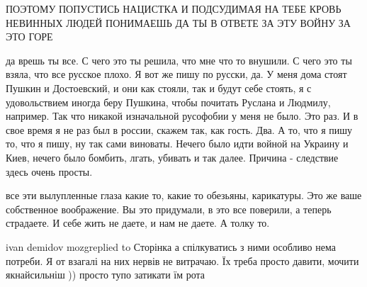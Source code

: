 ПОЭТОМУ ПОПУСТИСЬ НАЦИСТКА И ПОДСУДИМАЯ НА ТЕБЕ КРОВЬ НЕВИННЫХ ЛЮДЕЙ ПОНИМАЕШЬ
ДА ТЫ В ОТВЕТЕ ЗА ЭТУ ВОЙНУ ЗА ЭТО ГОРЕ

да врешь ты все. С чего это ты решила, что мне что то внушили. С чего это ты
взяла, что все русское плохо. Я вот же пишу по русски, да. У меня дома стоят
Пушкин и Достоевский, и они как стояли, так и будут себе стоять, я с
удовольствием иногда беру Пушкина, чтобы почитать Руслана и Людмилу, например.
Так что никакой изначальной русофобии у меня не было. Это раз. И в свое время я
не раз был в россии, скажем так, как гость. Два. А то, что я пишу то, что я
пишу, ну так сами виноваты. Нечего было идти войной на Украину и Киев, нечего
было бомбить, лгать, убивать и так далее. Причина - следствие здесь очень
просты.

все эти вылупленные глаза какие то, какие то обезьяны, карикатуры. Это же ваше
собственное воображение. Вы это придумали, в это все поверили, а теперь
страдаете. И себе жить не даете, и нам не даете. А толку то.

ivan demidov mozgreplied to Сторінка
а спілкуватись з ними особливо нема потреби. Я от взагалі на них нервів не
витрачаю. Їх треба просто давити, мочити якнайсильніш )) просто тупо затикати
їм рота













